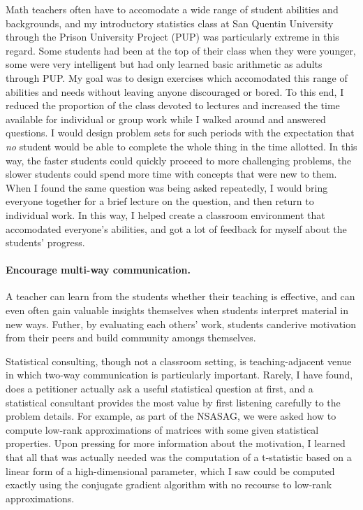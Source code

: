 Math teachers often have to accomodate a wide range of student abilities and
backgrounds, and my introductory statistics class at San Quentin University
through the Prison University Project (PUP) was particularly extreme in this
regard.  Some students had been at the top of their class when they were
younger, some were very intelligent but had only learned basic arithmetic as
adults through PUP.  My goal was to design exercises which accomodated this
range of abilities and needs without leaving anyone discouraged or bored. To
this end, I reduced the proportion of the class devoted to lectures and
increased the time available for individual or group work while I walked around
and answered questions.  I would design problem sets for such periods with the
expectation that \emph{no} student would be able to complete the whole thing in
the time allotted. In this way, the faster students could quickly proceed to
more challenging problems, the slower students could spend more time with
concepts that were new to them. When I found the same question was being asked
repeatedly, I would bring everyone together for a brief lecture on the question,
and then return to individual work.  In this way, I helped create a classroom
environment that accomodated everyone's abilities, and got a lot of feedback
for myself about the students' progress.

\paragraph{Encourage multi-way communication.}

A teacher can learn from the students whether their teaching is effective, and
can even often gain valuable insights themselves when students interpret
material in new ways.  Futher, by evaluating each others' work, students
canderive motivation from their peers and build community amongs themselves.

Statistical consulting, though not a classroom setting, is teaching-adjacent
venue in which two-way communication is particularly important.  Rarely, I have
found, does a petitioner actually ask a useful statistical question at first,
and a statistical consultant provides the most value by first listening
carefully to the problem details.  For example, as part of the NSASAG, we were
asked how to compute low-rank approximations of matrices with some given
statistical properties.  Upon pressing for more information about the
motivation, I learned that all that was actually needed was the computation of
a t-statistic based on a linear form of a high-dimensional parameter, which I
saw could be computed exactly using the conjugate gradient algorithm with no
recourse to low-rank approximations.

